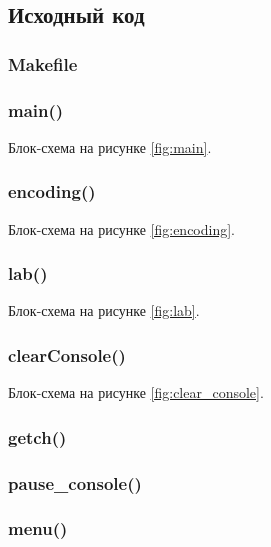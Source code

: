 \documentclass[12pt, a4paper]{article}
\begin{document}
\subsection{Исходный код}

\subsubsection{Makefile}


\subsubsection{main()}
Блок-схема на рисунке \ref{fig:main}.



\subsubsection{encoding()}
Блок-схема на рисунке \ref{fig:encoding}.



\subsubsection{lab()}
Блок-схема на рисунке \ref{fig:lab}.



\subsubsection{clearConsole()}
Блок-схема на рисунке \ref{fig:clear_console}.



\subsubsection{getch()}



\subsubsection{pause\_console()}



\subsubsection{menu()}


\end{document}
